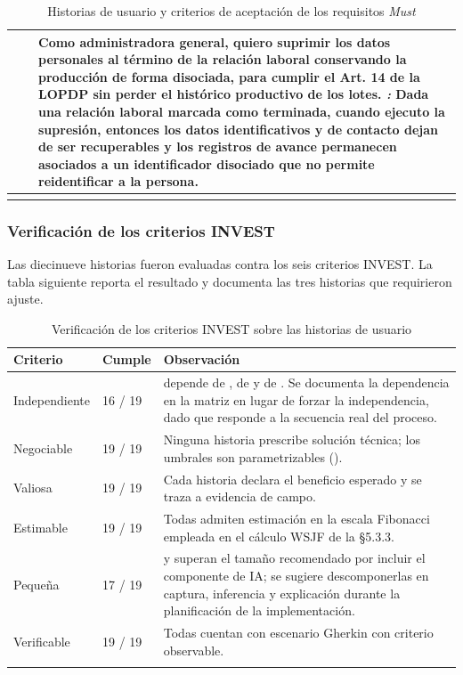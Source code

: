 \begin{longtable}{|C{1.3cm}|C{1.3cm}|L{12.4cm}|}
 &  & \textbf{Como} administradora general, \textbf{quiero} suprimir los datos personales al término de la relación laboral conservando la producción de forma disociada, \textbf{para} cumplir el Art. 14 de la LOPDP sin perder el histórico productivo de los lotes. \newline \emph{:} \textbf{Dada} una relación laboral marcada como terminada, \textbf{cuando} ejecuto la supresión, \textbf{entonces} los datos identificativos y de contacto dejan de ser recuperables \textbf{y} los registros de avance permanecen asociados a un identificador disociado que no permite reidentificar a la persona. \\ \hline
\caption{Historias de usuario y criterios de aceptación de los requisitos \emph{Must}}
\end{longtable}

\subsubsection{Verificación de los criterios INVEST}

Las diecinueve historias fueron evaluadas contra los seis criterios INVEST. La tabla siguiente
reporta el resultado y documenta las tres historias que requirieron ajuste.

\begin{longtable}{|L{2.4cm}|C{1.6cm}|L{11.0cm}|}
\hline
{}\textbf{Criterio} & \textbf{Cumple} & \textbf{Observación} \\
\hline
\endhead
Independiente & 16 / 19 &  depende de ,  de  y  de . Se documenta la dependencia en la matriz en lugar de forzar la independencia, dado que responde a la secuencia real del proceso. \\ \hline
Negociable & 19 / 19 & Ninguna historia prescribe solución técnica; los umbrales son parametrizables (). \\ \hline
Valiosa & 19 / 19 & Cada historia declara el beneficio esperado y se traza a evidencia de campo. \\ \hline
Estimable & 19 / 19 & Todas admiten estimación en la escala Fibonacci empleada en el cálculo WSJF de la §5.3.3. \\ \hline
Pequeña & 17 / 19 &  y  superan el tamaño recomendado por incluir el componente de IA; se sugiere descomponerlas en captura, inferencia y explicación durante la planificación de la implementación. \\ \hline
Verificable & 19 / 19 & Todas cuentan con escenario Gherkin con criterio observable. \\ \hline
\caption{Verificación de los criterios INVEST sobre las historias de usuario}
\end{longtable}

